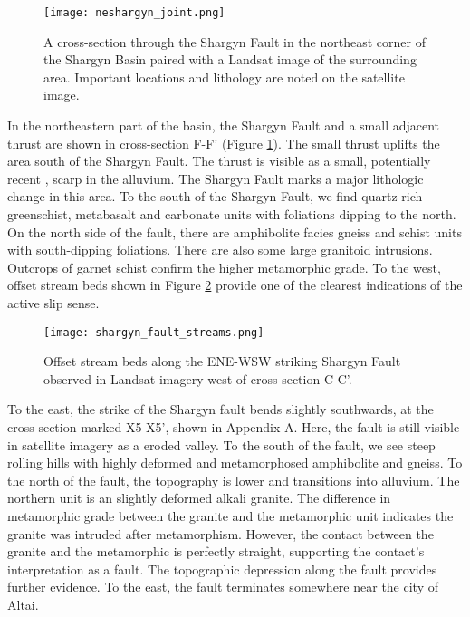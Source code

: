 \begin{figure}[h!]
  \centering
  \texttt{[image: neshargyn\_joint.png]}
  \caption{A cross-section through the Shargyn Fault in the northeast corner of the Shargyn Basin paired with a Landsat image of the surrounding area. Important locations and lithology are noted on the satellite image.}
  \label{neshargyn_joint}
\end{figure}

In the northeastern part of the basin, the Shargyn Fault and a small adjacent thrust are shown in cross-section F-F' (Figure \ref{neshargyn_joint}). The small thrust uplifts the area south of the Shargyn Fault. The thrust is visible as a small, potentially recent \citep{Bayasgalan2005a}, scarp in the alluvium. The Shargyn Fault marks a major lithologic change in this area. To the south of the Shargyn Fault, we find quartz-rich greenschist, metabasalt and carbonate units with foliations dipping to the north. On the north side of the fault, there are amphibolite facies gneiss and schist units with south-dipping foliations. There are also some large granitoid intrusions. Outcrops of garnet schist confirm the higher metamorphic grade. To the west, offset stream beds shown in Figure \ref{shargynoffsetstreams} provide one of the clearest indications of the active slip sense.

\begin{figure}[h!]
  \centering
  \texttt{[image: shargyn\_fault\_streams.png]}
  \caption{Offset stream beds along the ENE-WSW striking Shargyn Fault observed in Landsat imagery west of cross-section C-C'.}
  \label{shargynoffsetstreams}
\end{figure}

To the east, the strike of the Shargyn fault bends slightly southwards, at the cross-section marked X5-X5', shown in Appendix A. Here, the fault is still visible in satellite imagery as a eroded valley. To the south of the fault, we see steep rolling hills with highly deformed and metamorphosed amphibolite and gneiss. To the north of the fault, the topography is lower and transitions into alluvium. The northern unit is an slightly deformed alkali granite. The difference in metamorphic grade between the granite and the metamorphic unit indicates the granite was intruded after metamorphism. However, the contact between the granite and the metamorphic is perfectly straight, supporting the contact's interpretation as a fault. The topographic depression along the fault provides further evidence. To the east, the fault terminates somewhere near the city of Altai. 


